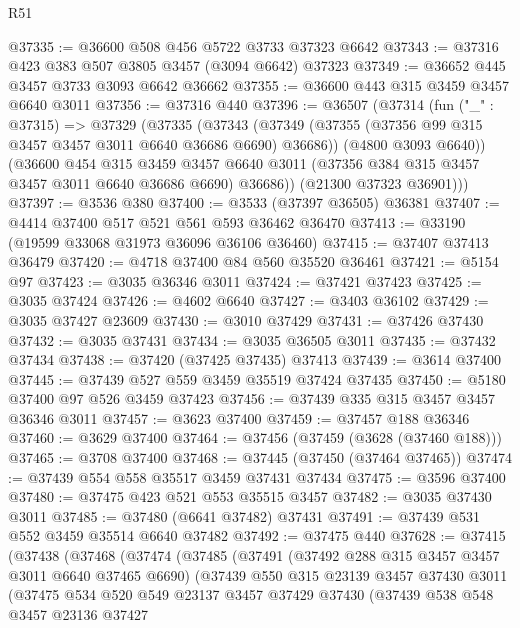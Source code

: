 \begin{lexlean}{R51}
\begin{coremodule}
@37335 := @36600 @508 @456 @5722 @3733 @37323 @6642
@37343 := @37316 @423 @383 @507 @3805 @3457 (@3094 @6642) @37323
@37349 := @36652 @445 @3457 @3733 @3093 @6642 @36662
@37355 := @36600 @443 @315 @3459 @3457 @6640 @3011
@37356 := @37316 @440
@37396 := @36507
    (@37314
      (fun ("_" : @37315) =>
      @37329
        (@37335
          (@37343
            (@37349 (@37355 (@37356 @99 @315 @3457 @3457 @3011 @6640 @36686 @6690) @36686))
            (@4800 @3093 @6640))
          (@36600
            @454
            @315
            @3459
            @3457
            @6640
            @3011
            (@37356 @384 @315 @3457 @3457 @3011 @6640 @36686 @6690)
            @36686))
        (@21300 @37323 @36901)))
@37397 := @3536 @380
@37400 := @3533 (@37397 @36505) @36381
@37407 := @4414 @37400 @517 @521 @561 @593 @36462 @36470
@37413 := @33190 (@19599 @33068 @31973 @36096 @36106 @36460)
@37415 := @37407 @37413 @36479
@37420 := @4718 @37400 @84 @560 @35520 @36461
@37421 := @5154 @97
@37423 := @3035 @36346 @3011
@37424 := @37421 @37423
@37425 := @3035 @37424
@37426 := @4602 @6640
@37427 := @3403 @36102
@37429 := @3035 @37427 @23609
@37430 := @3010 @37429
@37431 := @37426 @37430
@37432 := @3035 @37431
@37434 := @3035 @36505 @3011
@37435 := @37432 @37434
@37438 := @37420 (@37425 @37435) @37413
@37439 := @3614 @37400
@37445 := @37439 @527 @559 @3459 @35519 @37424 @37435
@37450 := @5180 @37400 @97 @526 @3459 @37423
@37456 := @37439 @335 @315 @3457 @3457 @36346 @3011
@37457 := @3623 @37400
@37459 := @37457 @188 @36346
@37460 := @3629 @37400
@37464 := @37456 (@37459 (@3628 (@37460 @188)))
@37465 := @3708 @37400
@37468 := @37445 (@37450 (@37464 @37465))
@37474 := @37439 @554 @558 @35517 @3459 @37431 @37434
@37475 := @3596 @37400
@37480 := @37475 @423 @521 @553 @35515 @3457
@37482 := @3035 @37430 @3011
@37485 := @37480 (@6641 @37482) @37431
@37491 := @37439 @531 @552 @3459 @35514 @6640 @37482
@37492 := @37475 @440
@37628 := @37415
    (@37438
      (@37468
        (@37474
          (@37485
            (@37491
              (@37492 @288 @315 @3457 @3457 @3011 @6640 @37465 @6690)
              (@37439
                @550
                @315
                @23139
                @3457
                @37430
                @3011
                (@37475
                  @534
                  @520
                  @549
                  @23137
                  @3457
                  @37429
                  @37430
                  (@37439
                    @538
                    @548
                    @3457
                    @23136
                    @37427

\end{coremodule}
\end{lexlean}
